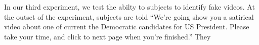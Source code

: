 

In our third experiment, we test the abilty to subjects to identify
fake videos. At the outset of the experiment, subjects are told
``We're going show you a satirical video about one of current the
Democratic candidates for US President. Please take your time, and
click to next page when you're finished.'' They 
